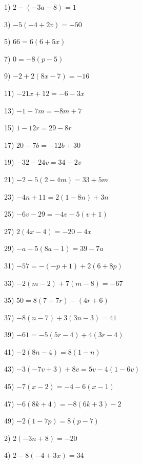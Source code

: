 \begin{multicols}{2}
  1) $2 - (- 3 a - 8) = 1$ \ \ \ \ \ \ \ \ \ \
  
  3) $- 5 (- 4 + 2 v) = - 50$ \ \ \ \ \ \ \ \ \ \
  
  5) $66 = 6 (6 + 5 x) $ \ \ \ \ \ \ \ \ \ \ \ \ \ \ \ \ \ \ \ \
  
  7) $0 = - 8 (p - 5)$ \ \ \ \ \ \ \ \ \ \ \ \ \ \ \ \ \ \ \ \ \ \ \
  
  9) $- 2 + 2 (8 x - 7) = - 16$ \ \ \ \ \ \ \ \ \ \ \
  
  11) $- 21 x + 12 = - 6 - 3 x$ \ \ \ \ \ \ \ \ \ \ \ \ \ \
  
  13) $- 1 - 7 m = - 8 m + 7$ \ \ \ \ \ \ \ \ \ \ \ \ \ \
  
  15) $1 - 12 r = 29 - 8 r$ \ \ \ \ \ \ \ \ \ \ \ \ \ \ \
  
  17) $20 - 7 b = - 12 b + 30$ \ \ \ \ \ \ \ \ \ \ \ \ \ \ \ \ \
  
  19) $- 32 - 24 v = 34 - 2 v$ \ \ \ \ \ \ \ \ \ \ \ \
  
  21) $- 2 - 5 (2 - 4 m) = 33 + 5 m$ \ \ \ \ \ \ \ \
  
  23) $- 4 n + 11 = 2 (1 - 8 n) + 3 n$ \ \ \ \ \ \
  
  25) $- 6 v - 29 = - 4 v - 5 (v + 1) $ \ \ \ \ \ \
  
  27) $2 (4 x - 4) = - 20 - 4 x$ \ \ \ \ \ \ \ \ \ \ \ \ \
  
  29) $- a - 5 (8 a - 1) = 39 - 7 a$ \ \ \ \ \ \ \
  
  31) $- 57 = - (- p + 1) + 2 (6 + 8 p)$ \ \ \ \
  
  33) $- 2 (m - 2) + 7 (m - 8) = - 67$ \ \ \
  
  35) $50 = 8 (7 + 7 r) - (4 r + 6)$ \ \ \ \ \ \ \ \
  
  37) $- 8 (n - 7) + 3 (3 n - 3) = 41$ \ \ \ \ \ \ \
  
  39) $- 61 = - 5 (5 r - 4) + 4 (3 r - 4)$ \
  
  41) $- 2 (8 n - 4) = 8 (1 - n)$ \ \ \ \ \ \ \ \ \ \ \ \
  
  43) $- 3 (- 7 v + 3) + 8 v = 5 v - 4 (1 - 6 v) $
  
  45) $- 7 (x - 2) = - 4 - 6 (x - 1)$ \ \ \ \ \ \ \ \ \
  
  47) $- 6 (8 k + 4) = - 8 (6 k + 3) - 2$ \ \ \ \ \
  
  49) $- 2 (1 - 7 p) = 8 (p - 7)$ \ \ \ \ \ \ \ \ \ \ \ \
  
  2) $2 (- 3 n + 8) = - 20$
  
  4) $2 - 8 (- 4 + 3 x) = 34$
  

\end{multicols}
